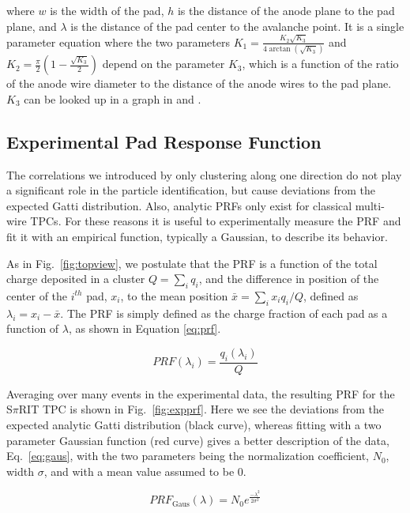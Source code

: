 where $w$ is the width of the pad, $h$ is the distance of the anode plane to the pad plane, and $\lambda$ is the distance of the pad center to the avalanche point. It is a single parameter equation where the two parameters $K_1 = \frac{K_{2}\sqrt{K_3}}{4 \arctan(\sqrt{K_3})}$ and $K_2 = \frac{\pi}{2}\left(1-\frac{\sqrt{K_{3}}}{2}\right)$ depend on the parameter $K_3$, which is a function of the ratio of the anode wire diameter to the distance of the anode wires to the pad plane. $K_3$ can be looked up in a graph in \cite{blumrol} and \cite{gatti}.



\subsection{Experimental Pad Response Function}

The correlations we introduced by only clustering along one direction do not play a significant role in the particle identification, but cause deviations from the expected Gatti distribution. Also, analytic PRFs only exist for classical multi-wire TPCs. For these reasons it is useful to experimentally measure the PRF and fit it with an empirical function, typically a Gaussian, to describe its behavior. 

As in Fig.~\ref{fig:topview}, we postulate that the PRF is a function of the total charge deposited in a cluster $Q = \sum_i q_i$, and the difference in position of the center of the $i^{th}$ pad, $x_i$, to the mean position $\bar{x} = \sum_i x_i q_i/Q$, defined as $\lambda_i = x_i-\bar{x}$. The PRF is simply defined as the charge fraction of each pad as a function of $\lambda$, as shown in Equation \ref{eq:prf}. 

\begin{equation}\label{eq:prf}
PRF(\lambda_i) = \frac{q_i(\lambda_i)}{Q}
\end{equation}

Averaging over many events in the experimental data, the resulting PRF for the S$\pi$RIT TPC is shown in Fig.~\ref{fig:expprf}. Here we see the deviations from the expected analytic Gatti distribution (black curve), whereas fitting with a two parameter Gaussian function (red curve) gives a better description of the  data, Eq.~\ref{eq:gaus}, with the two parameters being the normalization coefficient, $N_0$, width $\sigma$, and with a mean value assumed to be 0.

\begin{equation}\label{eq:gaus}
PRF_{\mathrm{Gaus}}(\lambda) = N_0 e^\frac{-\lambda^2}{2\sigma^2}
\end{equation}

